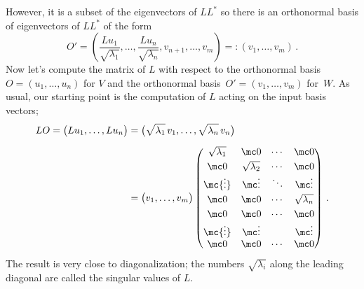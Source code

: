 However,  it is a subset of the eigenvectors of $LL^*$ so there is an orthonormal basis of eigenvectors of $LL^*$ of the form 
\[
O'=\left(\frac{Lu_1}{\sqrt{\lambda_1}},\ldots,\frac{Lu_n}{\sqrt{\lambda_n}},v_{n+1},\ldots,v_{m}\right)=:(v_1,\ldots,v_m)\, .
\]
Now let's compute the matrix of $L$ with respect to the orthonormal basis $O=(u_1,\ldots,u_n)$ for $V$ and the orthonormal basis~$O'=(v_1,\ldots,v_m)$ for~$W$. As usual, our starting point is the computation of $L$ acting on the input basis vectors;
\begin{align*}
LO=\big(Lu_1,\ldots, Lu_n\big)&=
\big(\sqrt{\lambda_1}\,  v_1,\ldots,\sqrt{\lambda_n}\,  v_n\big)\\[2mm]
&=\big(v_1,\ldots,v_m\big)
\begin{pmatrix}
\sqrt{\lambda_1}&\mc0&\cdots&\mc0\\[1mm]
\mc0&\sqrt{\lambda_2}&\cdots&\mc0\\
\mc{\vdots}&\mc\vdots&\ddots&\mc\vdots\\[1mm]
\mc0&\mc0&\cdots&\sqrt{\lambda_n}\\[1mm]
\mc 0 & \mc 0& \cdots &\mc 0\\
\mc{\vdots}&\mc\vdots&&\mc\vdots\\
\mc 0 & \mc 0& \cdots &\mc 0
\end{pmatrix}\, .
\end{align*}
The result is very close to diagonalization; the numbers $\sqrt{\lambda_i}$ along the leading diagonal are called the singular values of $L$.

